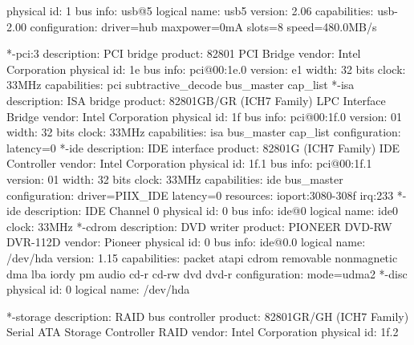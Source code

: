\documentclass[mingoth,a4paper]{jsarticle}
\begin{document}
{{{{{{{{{{{\begin{commandline}
                physical id: 1
                bus info: usb@5
                logical name: usb5
                version: 2.06
                capabilities: usb-2.00
                configuration: driver=hub maxpower=0mA slots=8 speed=480.0MB/s
\end{commandline}
\begin{commandline}
        *-pci:3
             description: PCI bridge
             product: 82801 PCI Bridge
             vendor: Intel Corporation
             physical id: 1e
             bus info: pci@00:1e.0
             version: e1
             width: 32 bits
             clock: 33MHz
             capabilities: pci subtractive_decode bus_master cap_list
        *-isa
             description: ISA bridge
             product: 82801GB/GR (ICH7 Family) LPC Interface Bridge
             vendor: Intel Corporation
             physical id: 1f
             bus info: pci@00:1f.0
             version: 01
             width: 32 bits
             clock: 33MHz
             capabilities: isa bus_master cap_list
             configuration: latency=0
        *-ide
             description: IDE interface
             product: 82801G (ICH7 Family) IDE Controller
             vendor: Intel Corporation
             physical id: 1f.1
             bus info: pci@00:1f.1
             version: 01
             width: 32 bits
             clock: 33MHz
             capabilities: ide bus_master
             configuration: driver=PIIX_IDE latency=0
             resources: ioport:3080-308f irq:233
           *-ide
                description: IDE Channel 0
                physical id: 0
                bus info: ide@0
                logical name: ide0
                clock: 33MHz
              *-cdrom
                   description: DVD writer
                   product: PIONEER DVD-RW DVR-112D
                   vendor: Pioneer
                   physical id: 0
                   bus info: ide@0.0
                   logical name: /dev/hda
                   version: 1.15
                   capabilities: packet atapi cdrom removable nonmagnetic dma lba iordy pm audio cd-r cd-rw dvd dvd-r
                   configuration: mode=udma2
                 *-disc
                      physical id: 0
                      logical name: /dev/hda
\end{commandline}
\begin{commandline}
        *-storage
             description: RAID bus controller
             product: 82801GR/GH (ICH7 Family) Serial ATA Storage Controller RAID
             vendor: Intel Corporation
             physical id: 1f.2

\end{commandline}}}}}}}}}}}}
\end{document}
